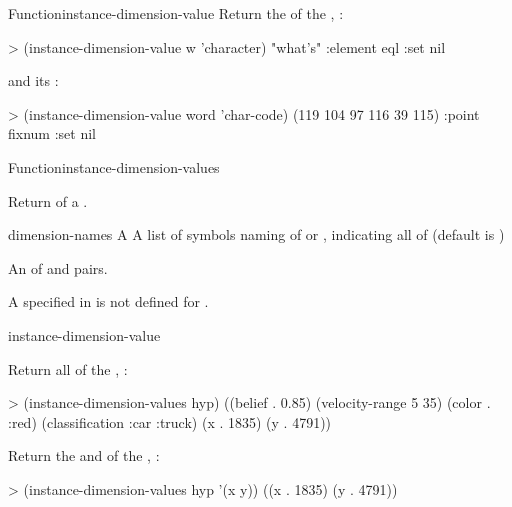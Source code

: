 \documentclass[10pt,twoside,english,pdftex]{article}
\begin{document}
\begin{functiondoc}{Function}{instance-dimension-value}
Return the   of the
, :
%
\W\supp
\begin{example}
> (instance-dimension-value w 'character)
"what's"
:element
eql
:set
nil
\end{example}
%
and its  :
%
\W\supp\notpretop
\begin{example}
> (instance-dimension-value word 'char-code)
(119 104 97 116 39 115)
:point
fixnum
:set
nil
\end{example}

\end{functiondoc}


\begin{functiondoc}{Function}{instance-dimension-values}%
  {
     
    \returns{} }
%
%

\fnsyntax

\fnpurpose Return  of a .

\fnpackage {}

\fnmodule {}

\fnargs
\begin{args}{dimension-names}
 A 
 A list of symbols naming  of
   or , indicating all  of 
   (default is )
\end{args}

\fnreturns An  of  and
 pairs.

\fnerrors A  specified in  is not
defined for .

\begin{alsos}{instance-dimension-value}
\end{alsos}

\fnexamples
%
Return all  of the , :
%
\W\supp
\begin{example}
> (instance-dimension-values hyp)
((belief . 0.85) (velocity-range 5 35) (color . :red)
 (classification :car :truck) (x . 1835) (y . 4791))
\end{example}
%
Return the  and   of the
, :
%
\W\supp\notpretop
\begin{example}
> (instance-dimension-values hyp '(x y))
((x . 1835) (y . 4791))
\end{example}


\end{functiondoc}
\end{document}
